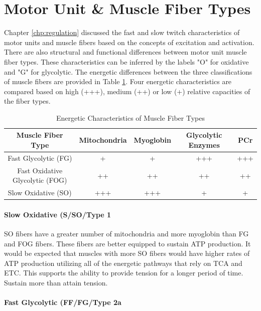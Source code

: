 \section{Motor Unit \& Muscle Fiber Types}

Chapter \ref{chp:regulation} discussed the fast and slow twitch characteristics of motor units and muscle fibers based on the concepts of excitation and activation. There are also structural and functional differences between motor unit muscle fiber types. These characteristics can be inferred by the labels "O" for oxidative and "G" for glycolytic. The energetic differences between the three classifications of muscle fibers are provided in Table \ref{table:Muscle_Fiber_Energetics}. Four energetic characteristics are compared based on high (+++), medium (++) or low (+) relative capacities of the fiber types. 

\begin{table}[h!]
\centering
\begin{tabular}{||c c c c c||} 
 \hline
 Muscle Fiber Type & Mitochondria & Myoglobin & Glycolytic Enzymes & PCr \\ [0.5ex] 
 \hline\hline
 Fast Glycolytic (FG)  & + & + & +++ & +++ \\ 
 Fast Oxidative Glycolytic (FOG) & ++ & ++ & ++ & ++ \\
 Slow Oxidative (SO) &  +++ & +++ & + & + \\ [1ex] 
 \hline
\end{tabular}
\caption{Energetic Characteristics of Muscle Fiber Types}
\label{table:Muscle_Fiber_Energetics}
\end{table}

\paragraph{Slow Oxidative (S/SO/Type 1}

SO fibers have a greater number of mitochondria and more myoglobin than FG and FOG fibers. These fibers are better equipped to sustain ATP production. It would be expected that muscles with more SO fibers would have higher rates of ATP production utilizing all of the energetic pathways that rely on TCA and ETC. This supports the ability to provide tension for a longer period of time. Sustain more than attain tension.

\paragraph{Fast Glycolytic (FF/FG/Type 2a}

